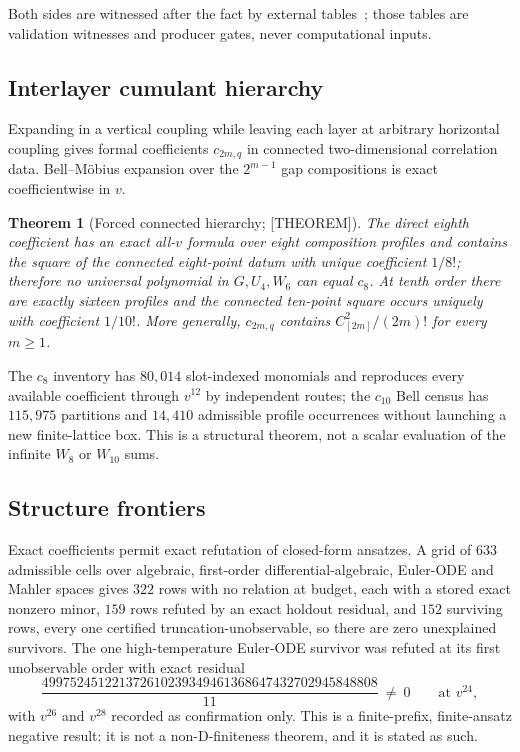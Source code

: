 \documentclass[11pt]{article}
\newtheorem{theorem}{Theorem}[section]
\theoremstyle{definition}
\begin{document}
Both sides are witnessed after the fact by external tables~\cite{arisuefujiwara2002,%
arisuefujiwara2003,guttmann_enting1993,butera2011}; those tables are validation witnesses and
producer gates, never computational inputs.

\subsection{Interlayer cumulant hierarchy}
Expanding in a vertical coupling while leaving each layer at arbitrary horizontal coupling gives
formal coefficients $c_{2m,q}$ in connected two-dimensional correlation data. Bell--M\"obius
expansion over the $2^{m-1}$ gap compositions is exact coefficientwise in $v$.

\begin{theorem}[Forced connected hierarchy; {[THEOREM]}]
The direct eighth coefficient has an exact all-$v$ formula over eight composition profiles and
contains the square of the connected eight-point datum with unique coefficient $1/8!$; therefore no
universal polynomial in $G,U_4,W_6$ can equal $c_8$. At tenth order there are exactly sixteen
profiles and the connected ten-point square occurs uniquely with coefficient $1/10!$. More generally,
$c_{2m,q}$ contains $C_{[2m]}^2/(2m)!$ for every $m\ge1$.
\end{theorem}

The $c_8$ inventory has $80{,}014$ slot-indexed monomials and reproduces every available coefficient
through $v^{12}$ by independent routes; the $c_{10}$ Bell census has $115{,}975$ partitions and
$14{,}410$ admissible profile occurrences without launching a new finite-lattice box. This is a
structural theorem, not a scalar evaluation of the infinite $W_8$ or $W_{10}$ sums.

\subsection{Structure frontiers}
Exact coefficients permit exact refutation of closed-form ansatzes. A grid of $633$ admissible cells
over algebraic, first-order differential-algebraic, Euler-ODE and Mahler spaces gives $322$ rows with
no relation at budget, each with a stored exact nonzero minor, $159$ rows refuted by an exact holdout
residual, and $152$ surviving rows, every one certified truncation-unobservable, so there are zero
unexplained survivors. The one high-temperature Euler-ODE survivor was refuted at its first
unobservable order with exact residual
\[
\frac{499752451221372610239349461368647432702945848808}{11}\ \ne\ 0
\qquad\text{at }v^{24},
\]
with $v^{26}$ and $v^{28}$ recorded as confirmation only. This is a finite-prefix, finite-ansatz
negative result: it is not a non-D-finiteness theorem, and it is stated as such.
\end{document}

